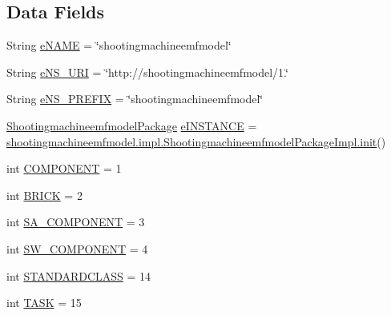 \subsection*{Data Fields}
\begin{DoxyCompactItemize}
\item 
String \hyperlink{interfaceshootingmachineemfmodel_1_1_shootingmachineemfmodel_package_a4478551bf090436803a93ef9544f0f6a}{e\-N\-A\-M\-E} = \char`\"{}shootingmachineemfmodel\char`\"{}
\item 
String \hyperlink{interfaceshootingmachineemfmodel_1_1_shootingmachineemfmodel_package_a82d88995e1a38d22711a9c8a17b873b8}{e\-N\-S\-\_\-\-U\-R\-I} = \char`\"{}http\-://shootingmachineemfmodel/1.\char`\"{}
\item 
String \hyperlink{interfaceshootingmachineemfmodel_1_1_shootingmachineemfmodel_package_a60c635ac3f47cc3d4b2ea76e4a09c980}{e\-N\-S\-\_\-\-P\-R\-E\-F\-I\-X} = \char`\"{}shootingmachineemfmodel\char`\"{}
\item 
\hyperlink{interfaceshootingmachineemfmodel_1_1_shootingmachineemfmodel_package}{Shootingmachineemfmodel\-Package} \hyperlink{interfaceshootingmachineemfmodel_1_1_shootingmachineemfmodel_package_a1a262932821c602a7ee1e9cbb214c625}{e\-I\-N\-S\-T\-A\-N\-C\-E} = \hyperlink{classshootingmachineemfmodel_1_1impl_1_1_shootingmachineemfmodel_package_impl_a5f3f76061791e8fd7740850ffc82b151}{shootingmachineemfmodel.\-impl.\-Shootingmachineemfmodel\-Package\-Impl.\-init}()
\item 
int \hyperlink{interfaceshootingmachineemfmodel_1_1_shootingmachineemfmodel_package_aa320a83958a1e101bf5743c8ea4d98c5}{C\-O\-M\-P\-O\-N\-E\-N\-T} = 1
\item 
int \hyperlink{interfaceshootingmachineemfmodel_1_1_shootingmachineemfmodel_package_a6355a6c7462f68952499f472884795ab}{B\-R\-I\-C\-K} = 2
\item 
int \hyperlink{interfaceshootingmachineemfmodel_1_1_shootingmachineemfmodel_package_a9fd6d4bea46299ebbede2da5a88ff984}{S\-A\-\_\-\-C\-O\-M\-P\-O\-N\-E\-N\-T} = 3
\item 
int \hyperlink{interfaceshootingmachineemfmodel_1_1_shootingmachineemfmodel_package_ab7ed8841e91d706d808f950aa3a7d367}{S\-W\-\_\-\-C\-O\-M\-P\-O\-N\-E\-N\-T} = 4
\item 
int \hyperlink{interfaceshootingmachineemfmodel_1_1_shootingmachineemfmodel_package_ae1c5b272bef559844d19b2f28cadf5dc}{S\-T\-A\-N\-D\-A\-R\-D\-C\-L\-A\-S\-S} = 14
\item 
int \hyperlink{interfaceshootingmachineemfmodel_1_1_shootingmachineemfmodel_package_a11c1e4cd4815521f642d021ef075f350}{T\-A\-S\-K} = 15

\end{DoxyCompactItemize}
